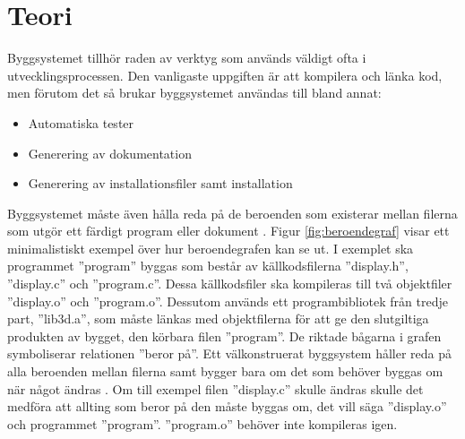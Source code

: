 \section{Teori}
Byggsystemet tillhör raden av verktyg som används väldigt ofta i utvecklingsprocessen. Den vanligaste uppgiften är att kompilera och länka kod, men förutom det så brukar byggsystemet användas till bland annat:

\begin{itemize}
  \item Automatiska tester
  \item Generering av dokumentation
  \item Generering av installationsfiler samt installation
\end{itemize}

Byggsystemet måste även hålla reda på de beroenden som existerar mellan filerna som utgör ett färdigt program eller dokument \citep{pragmaticautomation}.
\newline
\newline
Figur \ref{fig:beroendegraf} visar ett minimalistiskt exempel över hur beroendegrafen kan se ut. I exemplet ska programmet ''program'' byggas som består av källkodsfilerna ''display.h'', ''display.c'' och ''program.c''. Dessa källkodsfiler ska kompileras till två objektfiler ''display.o'' och ''program.o''. Dessutom används ett programbibliotek från tredje part, ''lib3d.a'', som måste länkas med objektfilerna för att ge den slutgiltiga produkten av bygget, den körbara filen ''program''. De riktade bågarna i grafen symboliserar relationen ''beror på''.
\newline
\newline
Ett välkonstruerat byggsystem håller reda på alla beroenden mellan filerna samt bygger bara om det som behöver byggas om när något ändras \citep{make}. Om till exempel filen ''display.c'' skulle ändras skulle det medföra att allting som beror på den måste byggas om, det vill säga ''display.o'' och programmet ''program''. ''program.o'' behöver inte kompileras igen.


